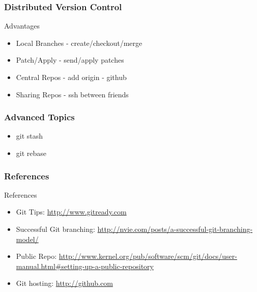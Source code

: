 \documentclass[10pt]{beamer}
\begin{document}
\begin{frame}
    \frametitle{Distributed Version Control}
    \begin{block}{Advantages}
        \begin{itemize}
            \item Local Branches - create/checkout/merge
            \item Patch/Apply - send/apply patches
            \item Central Repos - add origin - github
            \item Sharing Repos - ssh between friends
        \end{itemize}
    \end{block}
\end{frame}

\begin{frame}
    \frametitle{Advanced Topics}
    \begin{block}{}
        \begin{itemize}
            \item git stash
            \item git rebase
        \end{itemize}
    \end{block}
\end{frame}

\begin{frame}
    \frametitle{References}
    \begin{block}{References}
        \begin{itemize}
            \item Git Tips: \url{http://www.gitready.com}
            \item Successful Git branching: \url{http://nvie.com/posts/a-successful-git-branching-model/}
            \item Public Repo: \url{http://www.kernel.org/pub/software/scm/git/docs/user-manual.html\#setting-up-a-public-repository}
            \item Git hosting: \url{http://github.com}
        \end{itemize}
    \end{block}
\end{frame}
\end{document}
